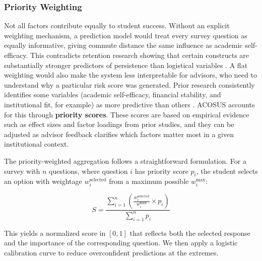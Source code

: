 \documentclass[letterpaper,11pt]{article}
\begin{document}
\subsubsection{Priority Weighting}

Not all factors contribute equally to student success. Without an explicit weighting mechanism, a prediction model would treat every survey question as equally informative, giving commute distance the same influence as academic self-efficacy. This contradicts retention research showing that certain constructs are substantially stronger predictors of persistence than logistical variables \parencite{factoranalysis2023}. A flat weighting would also make the system less interpretable for advisors, who need to understand why a particular risk score was generated. Prior research consistently identifies some variables (academic self-efficacy, financial stability, and institutional fit, for example) as more predictive than others \parencite{computingtransfer2024}. ACOSUS accounts for this through \textbf{priority scores}. These scores are based on empirical evidence such as effect sizes and factor loadings from prior studies, and they can be adjusted as advisor feedback clarifies which factors matter most in a given institutional context.

The priority-weighted aggregation follows a straightforward formulation. For a survey with $n$ questions, where question $i$ has priority score $p_i$, the student selects an option with weightage $w_i^{\text{selected}}$ from a maximum possible $w_i^{\text{max}}$:

\begin{equation}
S = \frac{\sum_{i=1}^{n} \left(\frac{w_i^{\text{selected}}}{w_i^{\text{max}}} \times p_i\right)}{\sum_{i=1}^{n} p_i}
\label{eq:priority}
\end{equation}

This yields a normalized score in $[0, 1]$ that reflects both the selected response and the importance of the corresponding question. We then apply a logistic calibration curve to reduce overconfident predictions at the extremes.
\end{document}
